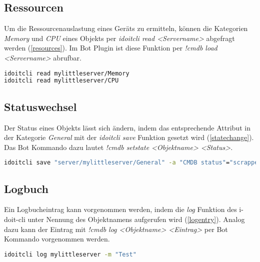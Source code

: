 \subsection{Ressourcen}
Um die Ressourcenauslastung eines Geräts zu ermitteln, können die Kategorien \textit{Memory} und \textit{CPU} eines Objekts per \textit{idoitcli read <Servername>} abgefragt werden (\autoref{resources}). Im Bot Plugin ist diese Funktion per \textit{!cmdb load <Servername>} abrufbar. 

\begin{lstlisting}[language=bash, label=resources, caption=Ressourcenauslastung eines Geräts]
idoitcli read mylittleserver/Memory
idoitcli read mylittleserver/CPU
\end{lstlisting}

\subsection{Statuswechsel}
Der Status eines Objekts lässt sich ändern, indem das entsprechende Attribut in der Kategorie \textit{General} mit der \textit{idoitcli save} Funktion gesetzt wird (\autoref{statechange}). Das Bot Kommando dazu lautet \textit{!cmdb setstate <Objektname> <Status>}.
\begin{lstlisting}[language=bash, label=statechange, caption=Statuswechsel eines Objekts]
idoitcli save "server/mylittleserver/General" -a "CMDB status"="scrapped"
\end{lstlisting}

\subsection{Logbuch}
Ein Logbucheintrag kann vorgenommen werden, indem die \textit{log} Funktion des i-doit-cli unter Nennung des Objektnamens aufgerufen wird (\autoref{logentry}). Analog dazu kann der Eintrag mit \textit{!cmdb log <Objektname> <Eintrag>} per Bot Kommando vorgenommen werden.
\begin{lstlisting}[language=bash, label=logentry, caption=Logbucheintag]
idoitcli log mylittleserver -m "Test"
\end{lstlisting}

